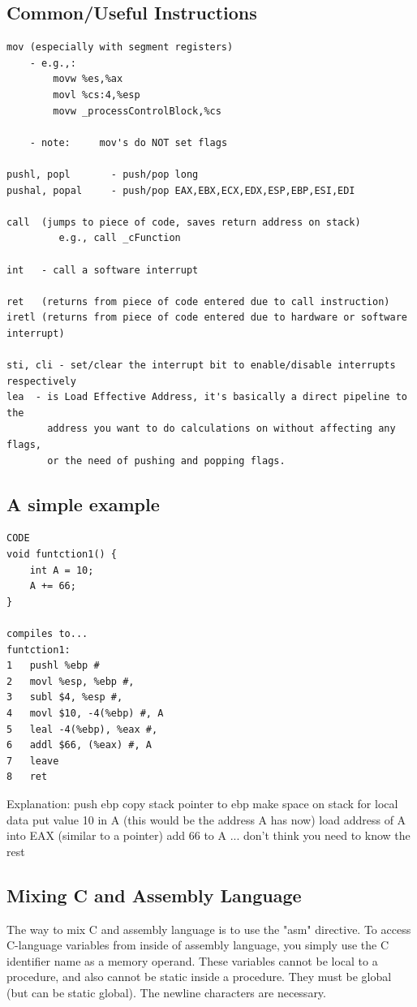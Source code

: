 \documentclass{note}
\begin{document}
{\subsection{Common/Useful Instructions}
\begin{verbatim}
mov (especially with segment registers)
    - e.g.,:
        movw %es,%ax
        movl %cs:4,%esp
        movw _processControlBlock,%cs

    - note:     mov's do NOT set flags

pushl, popl       - push/pop long
pushal, popal     - push/pop EAX,EBX,ECX,EDX,ESP,EBP,ESI,EDI

call  (jumps to piece of code, saves return address on stack)
         e.g., call _cFunction

int   - call a software interrupt

ret   (returns from piece of code entered due to call instruction)
iretl (returns from piece of code entered due to hardware or software interrupt)

sti, cli - set/clear the interrupt bit to enable/disable interrupts respectively
lea  - is Load Effective Address, it's basically a direct pipeline to the
       address you want to do calculations on without affecting any flags, 
       or the need of pushing and popping flags. 
\end{verbatim}
\subsection{A simple example}
\begin{verbatim}
CODE
void funtction1() {
	int A = 10;
	A += 66;
}

compiles to...
funtction1:
1	pushl %ebp #
2	movl %esp, %ebp #,
3	subl $4, %esp #,
4	movl $10, -4(%ebp) #, A
5	leal -4(%ebp), %eax #, 
6	addl $66, (%eax) #, A
7	leave
8	ret
\end{verbatim}
Explanation:
\ben
\w push ebp
\w  copy stack pointer to ebp
\w  make space on stack for local data
\w put value 10 in A (this would be the address A has now)
\w load address of A into EAX (similar to a pointer)
\w add 66 to A
\een
... don't think you need to know the rest

\subsection{Mixing C and Assembly Language}
The way to mix C and assembly language is to use the "asm" directive. To
access C-language variables from inside of assembly language, you simply use
the C identifier name as a memory operand. These variables cannot be local to
a procedure, and also cannot be static inside a procedure. They must be global
(but can be static global). The newline characters are necessary. 

}
\end{document}
